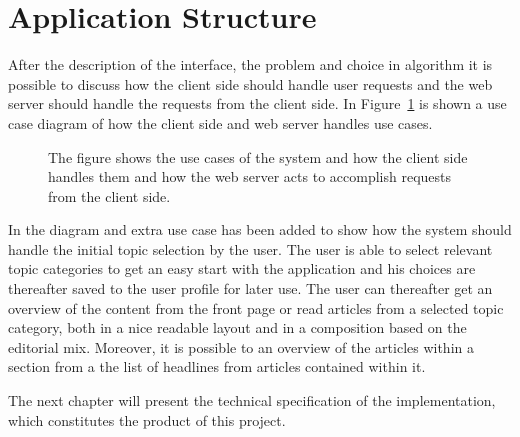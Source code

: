\section{Application Structure}
After the description of the interface, the problem and choice in algorithm it is possible to discuss how the client side should handle user requests and the web server should handle the requests from the client side. In Figure~\ref{fig:use-cases} is shown a use case diagram of how the client side and web server handles use cases.
\begin{figure}[h!tp]
	\myfloatalign
			\caption{The figure shows the use cases of the system and how the client side handles them and how the web server acts to accomplish requests from the client side.}
			\label{fig:use-cases}
\end{figure}

In the diagram and extra use case has been added to show how the system should handle the initial topic selection by the user. The user is able to select relevant topic categories to get an easy start with the application and his choices are thereafter saved to the user profile for later use. The user can thereafter get an overview of the content from the front page or read articles from a selected topic category, both in a nice readable layout and in a composition based on the editorial mix. Moreover, it is possible to an overview of the articles within a section from a the list of headlines from articles contained within it.

The next chapter will present the technical specification of the implementation, which constitutes the product of this project.
%
%

